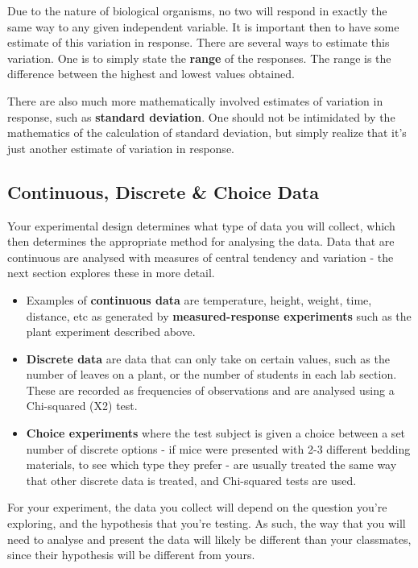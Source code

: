 \documentclass[
]{book}
\providecommand{\tightlist}{%
  \setlength{\itemsep}{0pt}\setlength{\parskip}{0pt}}
\begin{document}
Due to the nature of biological organisms, no two will respond in exactly the same way to any given independent variable. It is important then to have some estimate of this variation in response. There are several ways to estimate this variation. One is to simply state the \textbf{range} of the responses. The range is the difference between the highest and lowest values obtained.

There are also much more mathematically involved estimates of variation in response, such as \textbf{standard deviation}. One should not be intimidated by the mathematics of the calculation of standard deviation, but simply realize that it's just another estimate of variation in response.

\hypertarget{continuous-discrete-choice-data}{%
\subsection*{Continuous, Discrete \& Choice Data}\label{continuous-discrete-choice-data}}

Your experimental design determines what type of data you will collect, which then determines the appropriate method for analysing the data. Data that are continuous are analysed with measures of central tendency and variation - the next section explores these in more detail.

\begin{itemize}
\tightlist
\item
  Examples of \textbf{continuous data} are temperature, height, weight, time, distance, etc as generated by \textbf{measured-response experiments} such as the plant experiment described above.
\item
  \textbf{Discrete data} are data that can only take on certain values, such as the number of leaves on a plant, or the number of students in each lab section. These are recorded as frequencies of observations and are analysed using a Chi-squared (X2) test.
\item
  \textbf{Choice experiments} where the test subject is given a choice between a set number of discrete options - if mice were presented with 2-3 different bedding materials, to see which type they prefer - are usually treated the same way that other discrete data is treated, and Chi-squared tests are used.
\end{itemize}

For your experiment, the data you collect will depend on the question you're exploring, and the hypothesis that you're testing. As such, the way that you will need to analyse and present the data will likely be different than your classmates, since their hypothesis will be different from yours.
\end{document}
